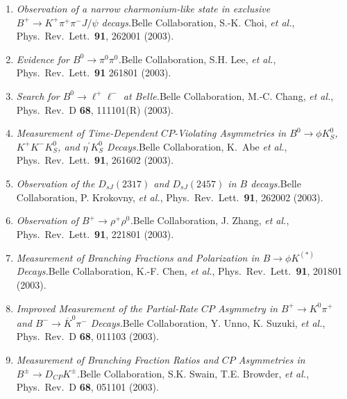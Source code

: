 \documentclass[10pt,a4paper]{article}
\def\pub#1#2#3{{\it #1.}\newline #2, #3.}
\def\cited#1{Cited $\ge$ #1}
\def\PRL{Phys.\ Rev.\ Lett.\ }
\def\PRD{Phys.\ Rev.\ D }
\def\etal{{\it et al.}}
\def\belle{Belle Collaboration, K.~Abe \etal }
\begin{document}
\begin{enumerate}
\item
\pub{Observation of a narrow charmonium-like state in exclusive $B^+ \to K^+ \pi^+ \pi^- J/\psi$ decays}
{Belle Collaboration, S.-K. Choi, \etal}
{\PRL {\bf 91}, 262001 (2003)}

\item
\pub{Evidence for $B^0 \to \pi^0 \pi^0$}
{Belle Collaboration, S.H. Lee, \etal}
{\PRL {\bf 91} 261801 (2003)}

\item
\pub{Search for $B^0 \to \ell^+ \ell^-$ at Belle}
{Belle Collaboration, M.-C. Chang, \etal}
{\PRD {\bf 68}, 111101(R) (2003)}

\item
\pub{Measurement of Time-Dependent $CP$-Violating Asymmetries in $B^0 \to \phi K_S^0$, $K^+ K^- K_S^0$, and $\eta^\prime K_S^0$ Decays}
{\belle}
{\PRL {\bf 91}, 261602 (2003)}

\item
\pub{Observation of the $D_{sJ}(2317)$ and $D_{sJ}(2457)$ in $B$ decays}
{Belle Collaboration, P. Krokovny, \etal}
{\PRL {\bf 91}, 262002 (2003)}


\item
\pub{Observation of $B^+ \to \rho^+ \rho^0$}
{Belle Collaboration, J. Zhang, \etal}
{\PRL {\bf 91}, 221801 (2003)}

\item
\pub{Measurement of Branching Fractions and Polarization in $B \to \phi K^{(*)}$ Decays}
{Belle Collaboration, K.-F. Chen, \etal}
{\PRL {\bf 91}, 201801 (2003)}

\item
\pub{Improved Measurement of the Partial-Rate $CP$ Asymmetry in $B^{+} \to  K^{0}\pi^{+}$ and $B^{-} \to \overline{K}^{0} \pi^{-}$ Decays}
{Belle Collaboration, Y. Unno, K. Suzuki, \etal}
{\PRD {\bf 68}, 011103 (2003)}

\item
\pub{Measurement of Branching Fraction Ratios and $CP$ Asymmetries in  $B^{\pm} \to D_{CP}K^{\pm}$}
{Belle Collaboration, S.K. Swain, T.E. Browder, \etal}
{\PRD {\bf 68},  051101 (2003)}


\end{enumerate}
\end{document}

